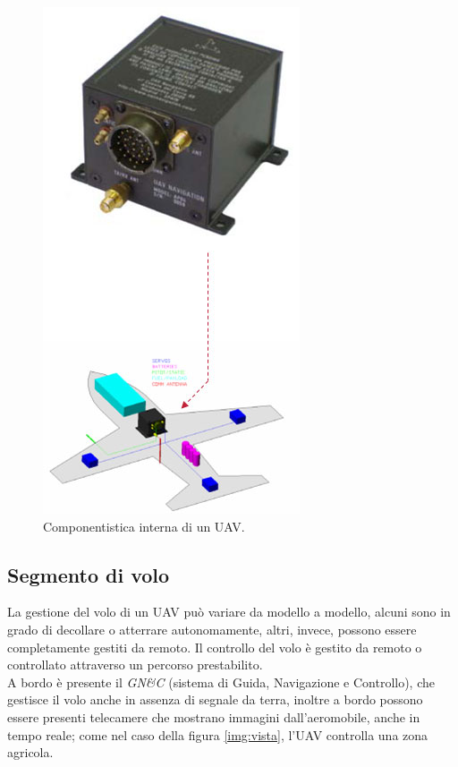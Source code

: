\begin{figure}[!h]
  \centering
  \includegraphics[height=0.25\textheight]{Immagini/segvolo}
  \caption{Componentistica interna di un \ac{UAV}.}
  \label{img:comp}
\end{figure}

\subsection*{Segmento di volo}
La gestione del volo di un \ac{UAV} può variare da modello a modello, alcuni sono in grado di decollare o atterrare autonomamente, altri,
invece, possono essere completamente gestiti da remoto. Il controllo del volo è gestito da remoto o controllato attraverso un percorso
prestabilito. \\
A bordo è presente il \emph{GN\&C} (sistema di Guida, Navigazione e Controllo), che gestisce il volo anche in assenza di segnale da terra,
inoltre a bordo possono essere presenti telecamere che mostrano immagini dall'aeromobile, anche in tempo reale; come nel caso della figura
\ref{img:vista}, l'\ac{UAV} controlla una zona agricola.

